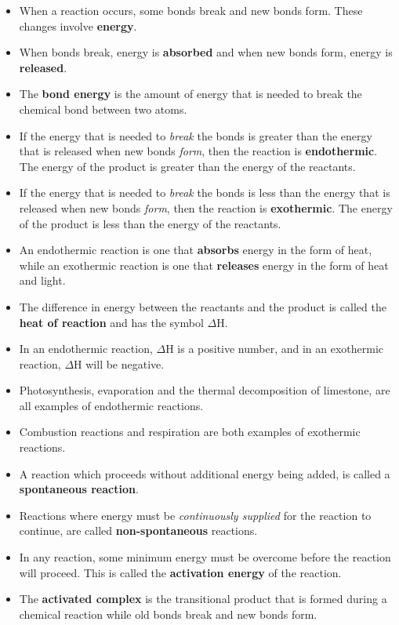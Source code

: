 \begin{itemize}
\item{When a reaction occurs, some bonds break and new bonds form. These changes involve \textbf{energy}.}
\item{When bonds break, energy is \textbf{absorbed} and when new bonds form, energy is \textbf{released}.}
\item{The \textbf{bond energy} is the amount of energy that is needed to break the chemical bond between two atoms.}
\item{If the energy that is needed to \textit{break} the bonds is greater than the energy that is released when new bonds \textit{form}, then the reaction is \textbf{endothermic}. The energy of the product is greater than the energy of the reactants.}
\item{If the energy that is needed to \textit{break} the bonds is less than the energy that is released when new bonds \textit{form}, then the reaction is \textbf{exothermic}. The energy of the product is less than the energy of the reactants.}
\item{An endothermic reaction is one that \textbf{absorbs} energy in the form of heat, while an exothermic reaction is one that \textbf{releases} energy in the form of heat and light.}
\item{The difference in energy between the reactants and the product is called the \textbf{heat of reaction} and has the symbol $\Delta$H.}
\item{In an endothermic reaction, $\Delta$H is a positive number, and in an exothermic reaction, $\Delta$H will be negative.}
\item{Photosynthesis, evaporation and the thermal decomposition of limestone, are all examples of endothermic reactions.}
\item{Combustion reactions and respiration are both examples of exothermic reactions.}
\item{A reaction which proceeds without additional energy being added, is called a \textbf{spontaneous reaction}.}
\item{Reactions where energy must be \textit{continuously supplied} for the reaction to continue, are called \textbf{non-spontaneous} reactions.}
\item{In any reaction, some minimum energy must be overcome before the reaction will proceed. This is called the \textbf{activation energy} of the reaction.}
\item{The \textbf{activated complex} is the transitional product that is formed during a chemical reaction while old bonds break and new bonds form.}
\end{itemize}

